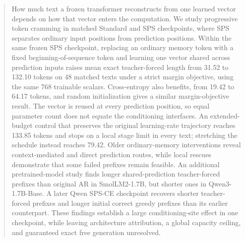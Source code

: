 \documentclass{article}
\begin{document}
\printAffiliationsAndNotice{}

\begin{abstract}
How much text a frozen transformer reconstructs from one learned vector depends on how that vector enters the computation.
We study progressive token cramming in matched Standard and SPS checkpoints, where SPS separates ordinary input positions from prediction positions.
Within the same frozen SPS checkpoint, replacing an ordinary memory token with a fixed beginning-of-sequence token and learning one vector shared across prediction inputs raises mean exact teacher-forced length from 31.52 to 132.10 tokens on 48 matched texts under a strict margin objective, using the same 768 trainable scalars.
Cross-entropy also benefits, from 19.42 to 64.17 tokens, and random initialization gives a similar margin-objective result.
The vector is reused at every prediction position, so equal parameter count does not equate the conditioning interfaces.
An extended-budget control that preserves the original learning-rate trajectory reaches 133.85 tokens and stops on a local stage limit in every text; stretching the schedule instead reaches 79.42.
Older ordinary-memory interventions reveal context-mediated and direct prediction routes, while local rescues demonstrate that some failed prefixes remain feasible.
An additional pretrained-model study finds longer shared-prediction teacher-forced prefixes than original AR in SmolLM2-1.7B, but shorter ones in Qwen3-1.7B-Base. A later Qwen SPS-CE checkpoint recovers shorter teacher-forced prefixes and longer initial correct greedy prefixes than its earlier counterpart.
These findings establish a large conditioning-site effect in one checkpoint, while leaving architecture attribution, a global capacity ceiling, and guaranteed exact free generation unresolved.
\end{abstract}
\end{document}
